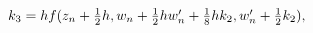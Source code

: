 $k_{3}=hf(z_{n}+\tfrac{1}{2}h,w_{n}+\tfrac{1}{2}hw^{\prime}_{n}+\tfrac{1}{8}hk_%
{2},w^{\prime}_{n}+\tfrac{1}{2}k_{2}),$